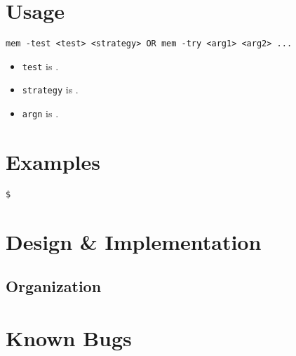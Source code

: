 \documentclass[paper=a4, fontsize=11pt]{scrartcl}
\begin{document}
\section*{Usage}
\texttt{mem -test <test> <strategy> OR mem -try <arg1> <arg2> ...}

\begin{itemize}
  \item \texttt{test} is .

  \item \texttt{strategy} is .

  \item \texttt{argn} is .
\end{itemize}


\section*{Examples}
\begin{lstlisting}[style=ShellStyle]$
\end{lstlisting}

\section*{Design \& Implementation}
\subsection*{Organization}




\section*{Known Bugs}
\end{document}
